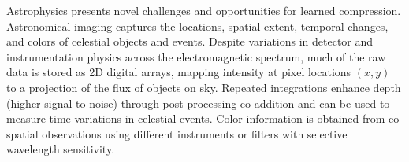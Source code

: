 Astrophysics presents novel challenges and opportunities for learned compression. Astronomical imaging captures the locations, spatial extent, temporal changes, and colors of celestial objects and events. Despite variations in detector and instrumentation physics across the electromagnetic spectrum, much of the raw data is stored as 2D digital arrays, mapping intensity at pixel locations $(x, y)$ to a projection of the flux of objects on sky. Repeated integrations enhance depth (higher signal-to-noise) through post-processing co-addition and can be used to measure time variations in celestial events. Color information is obtained from co-spatial observations using different instruments or filters with selective wavelength sensitivity.


